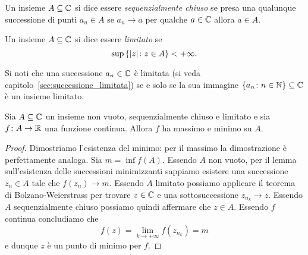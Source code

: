 \begin{definition}
Un insieme $A\subseteq {\mathbb C}$ si dice
essere \emph{sequenzialmente chiuso}
%
%
se presa una qualunque successione
di punti $a_n\in A$ se $a_n \to a$ per qualche $a\in {\mathbb C}$
allora $a\in A$.
\end{definition}

\begin{definition}[limitatezza]
Un insieme $A\subseteq {\mathbb C}$ si dice essere \emph{limitato}%
%
se
\[
  \sup {\left\{  {\left|z\right|}\colon z \in A \right\}} < +\infty.
\]
\end{definition}

Si noti che una successione $a_n\in {\mathbb C}$ 
è limitata (si veda capitolo~\ref{sec:successione_limitata})
se e solo se la sua immagine ${\left\{ a_n\colon n\in {\mathbb N} \right\}}\subseteq {\mathbb C}$
è un insieme limitato.


\begin{theorem}
Sia $A\subseteq {\mathbb C}$ un insieme non vuoto, sequenzialmente chiuso e limitato e sia $f\colon A \to {\mathbb R}$ una funzione continua.
Allora $f$ ha massimo e minimo su $A$.
\end{theorem}
%
\begin{proof}
Dimostriamo l'esistenza del minimo: per il massimo la dimostrazione è perfettamente analoga.
Sia $m=\inf f(A)$.
Essendo $A$ non vuoto, per il lemma sull'esistenza delle successioni minimizzanti sappiamo esistere una successione $z_n \in A$ tale che $f(z_n) \to m$.
Essendo $A$ limitato possiamo applicare il teorema di Bolzano-Weierstrass per trovare $z\in {\mathbb C}$ e una sottosuccessione $z_{n_k} \to z$. Essendo $A$ sequenzialmente chiuso possiamo quindi affermare che $z\in A$. Essendo $f$ continua concludiamo che
\[
f(z) = \lim_{k\to+\infty} f(z_{n_k}) = m
\]
e dunque $z$ è un punto di minimo per $f$.
\end{proof}


